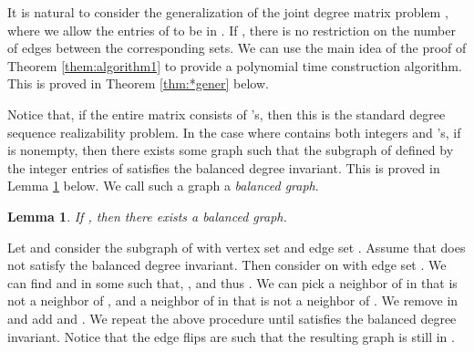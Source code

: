 \documentclass[12pt,a4paper]{article}
\theoremstyle{definition}
\theoremstyle{plain}
\newtheorem{lemma}[dfn]{Lemma}
\newenvironment{prf}{\noindent {\bf Proof.}}{\begin{flushright}\vspace{-2em}\footnotesize\normalsize\end{flushright}\smallskip}
\begin{document}
It is natural to consider the generalization of the joint degree matrix problem 
, where we allow 
the entries of  to be in . 
If , there is no restriction on the number of edges
between the corresponding sets.
We can use the 
main idea of the proof of Theorem \ref{them:algorithm1}
to provide a polynomial time construction algorithm.
This is proved in Theorem \ref{thm:*gener} below.

Notice that, if the entire matrix  consists of 's,
then this is the standard degree sequence realizability problem.
In the case where  contains both integers and 's, if  is nonempty, 
then there exists some graph
 such that the subgraph  of  defined
by the integer entries of  satisfies the balanced degree invariant. This is proved in Lemma \ref{lem:last} below.
We call such a graph 
a \emph{balanced  graph}.

\begin{lemma}
\label{lem:last}
If , then there exists a
balanced  graph.
\end {lemma}
\begin{prf}
Let  and consider the subgraph  of 
with vertex set  and edge set
. Assume that 
does not satisfy the balanced degree invariant. 
Then consider  on  with edge set
. We can find  and  in some  such that,
, and thus . 
We can pick
a neighbor  of  in  that is not a neighbor of , 
and a neighbor 
of  in  that is not a neighbor of . 
We remove  in  and add
 and . 
We repeat the above procedure until  satisfies the balanced
degree invariant. 
Notice that the edge flips are such that the resulting graph
 is still in .
\end{prf}
\end{document}

